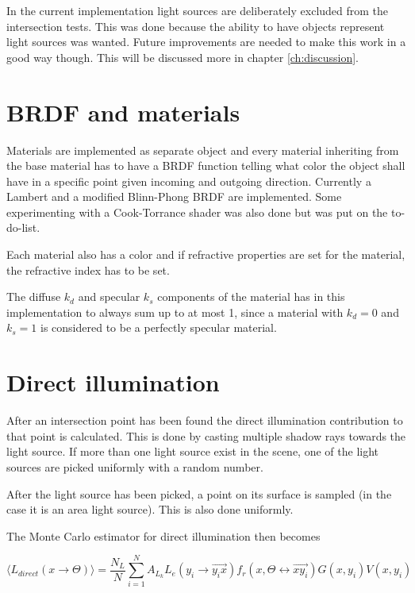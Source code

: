 \documentclass[a4paper]{report}
\begin{document}
In the current implementation light sources are deliberately excluded
from the intersection tests. This was done because the ability to have
objects represent light sources was wanted. Future improvements are
needed to make this work in a good way though. This will be discussed more in
chapter \ref{ch:discussion}.

\section{BRDF and materials}

Materials are implemented as separate object and every material
inheriting from the base material has to have a BRDF function telling
what color the object shall have in a specific point given incoming
and outgoing direction. Currently a Lambert and a modified Blinn-Phong
BRDF are implemented. Some experimenting with a Cook-Torrance shader
was also done but was put on the to-do-list.

Each material also has a color and if refractive properties are set
for the material, the refractive index has to be set.

The diffuse \(k_d\) and specular \(k_s\) components of the material
has in this implementation to always sum up to at most 1, since a
material with \(k_d = 0\) and \(k_s = 1\) is considered to be a
perfectly specular material. 

\section{Direct illumination}

After an intersection point has been found the direct illumination
contribution to that point is calculated. This is done by casting
multiple shadow rays towards the light source. If more than one light
source exist in the scene, one of the light sources are picked
uniformly with a random number. 

After the light source has been picked, a point on its surface is
sampled (in the case it is an area light source). This is also done uniformly.

The Monte Carlo estimator for direct illumination then becomes

\begin{equation}
  \langle L_{direct}(x \to \Theta) \rangle = \frac{N_L}{N}\sum^N_{i=1}
  A_{L_k}L_e(y_i \to \vec{y_ix})f_r(x,\Theta \leftrightarrow
  \vec{xy_i})G(x,y_i)V(x,y_i)
  \label{eq:direst}
\end{equation}
\end{document}
